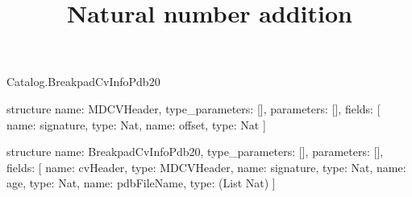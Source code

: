 \begin{lexlean}{Catalog.BreakpadCvInfoPdb20}
\title{Natural number addition}
\begin{semanticmodule}
structure{
  name: MDCVHeader,
  type_parameters: [],
  parameters: [],
  fields: [
    {name: signature, type: Nat},
    {name: offset, type: Nat}
  ]
}

structure{
  name: BreakpadCvInfoPdb20,
  type_parameters: [],
  parameters: [],
  fields: [
    {name: cvHeader, type: MDCVHeader},
    {name: signature, type: Nat},
    {name: age, type: Nat},
    {name: pdbFileName, type: (List Nat)}
  ]
}
\end{semanticmodule}
\end{lexlean}
